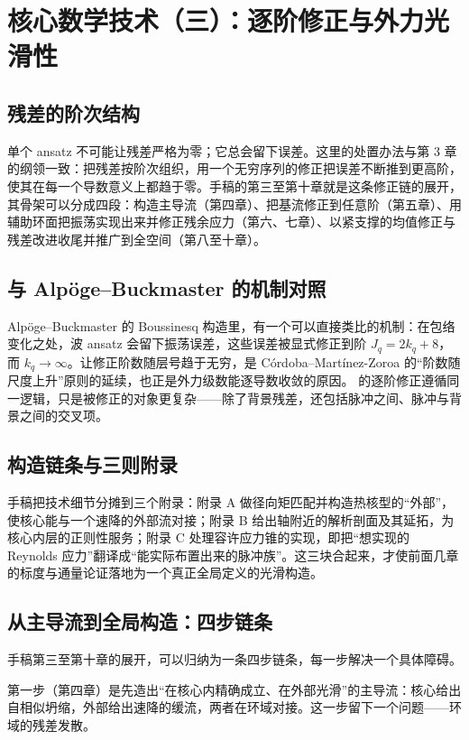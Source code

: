 \section{核心数学技术（三）：逐阶修正与外力光滑性}

\subsection{残差的阶次结构}

单个 ansatz 不可能让残差严格为零；它总会留下误差。这里的处置办法与第 3 章的纲领一致：把残差按阶次组织，用一个无穷序列的修正把误差不断推到更高阶，使其在每一个导数意义上都趋于零。手稿的第三至第十章就是这条修正链的展开，其骨架可以分成四段：构造主导流（第四章）、把基流修正到任意阶（第五章）、用辅助环面把振荡实现出来并修正残余应力（第六、七章）、以紧支撑的均值修正与残差改进收尾并推广到全空间（第八至十章）。

\subsection{与 Alpöge--Buckmaster 的机制对照}

Alpöge--Buckmaster 的 Boussinesq 构造里，有一个可以直接类比的机制：在包络变化之处，波 ansatz 会留下振荡误差，这些误差被显式修正到阶 $J_{q}=2k_{q}+8$，而 $k_{q}\to\infty$。让修正阶数随层号趋于无穷，是 Córdoba--Martínez-Zoroa 的“阶数随尺度上升”原则的延续，也正是外力级数能逐导数收敛的原因。\NS{} 的逐阶修正遵循同一逻辑，只是被修正的对象更复杂——除了背景残差，还包括脉冲之间、脉冲与背景之间的交叉项。

\subsection{构造链条与三则附录}

手稿把技术细节分摊到三个附录：附录 A 做径向矩匹配并构造热核型的“外部”，使核心能与一个速降的外部流对接；附录 B 给出轴附近的解析剖面及其延拓，为核心内层的正则性服务；附录 C 处理容许应力锥的实现，即把“想实现的 Reynolds 应力”翻译成“能实际布置出来的脉冲族”。这三块合起来，才使前面几章的标度与通量论证落地为一个真正全局定义的光滑构造。

\subsection{从主导流到全局构造：四步链条}

手稿第三至第十章的展开，可以归纳为一条四步链条，每一步解决一个具体障碍。

第一步（第四章）是先造出“在核心内精确成立、在外部光滑”的主导流：核心给出自相似坍缩，外部给出速降的缓流，两者在环域对接。这一步留下一个问题——环域的残差发散。

